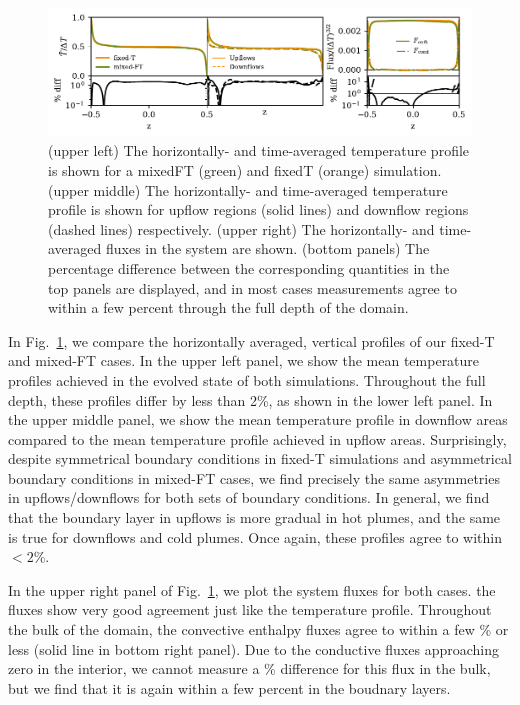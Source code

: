 \documentclass[aps, pre, onecolumn, nofootinbib, notitlepage, groupedaddress, amsfonts, amssymb, amsmath, longbibliography]{revtex4-1}
\begin{document}
\begin{figure}
\includegraphics[width=\textwidth]{./figs/rbc_1D_profiles.pdf}
\caption{ 
	(upper left) The horizontally- and time-averaged temperature profile is shown for a mixedFT (green) and fixedT (orange) simulation.
	(upper middle) The horizontally- and time-averaged temperature profile is shown for upflow regions (solid lines) and downflow regions (dashed lines) respectively.
	(upper right) The horizontally- and time-averaged fluxes in the system are shown.
	(bottom panels) The percentage difference between the corresponding quantities in the top panels are displayed, and in most cases measurements agree to within a few percent through the full depth of the domain.
\label{fig:rbc_1D_profiles} }
\end{figure}

In Fig.~\ref{fig:rbc_1D_profiles}, we compare the horizontally averaged, vertical profiles of our fixed-T and mixed-FT cases.
In the upper left panel, we show the mean temperature profiles achieved in the evolved state of both simulations.
Throughout the full depth, these profiles differ by less than 2\%, as shown in the lower left panel.
In the upper middle panel, we show the mean temperature profile in downflow areas compared to the mean temperature profile achieved in upflow areas.
Surprisingly, despite symmetrical boundary conditions in fixed-T simulations and asymmetrical boundary conditions in mixed-FT cases, we find precisely the same asymmetries in upflows/downflows for both sets of boundary conditions.
In general, we find that the boundary layer in upflows is more gradual in hot plumes, and the same is true for downflows and cold plumes.
Once again, these profiles agree to within $< 2\%$.

In the upper right panel of Fig.~\ref{fig:rbc_1D_profiles}, we plot the system fluxes for both cases.
the fluxes show very good agreement just like the temperature profile.
Throughout the bulk of the domain, the convective enthalpy fluxes agree to within a few \% or less (solid line in bottom right panel).
Due to the conductive fluxes approaching zero in the interior, we cannot measure a \% difference for this flux in the bulk, but we find that it is again within a few percent in the boudnary layers.
\end{document}
